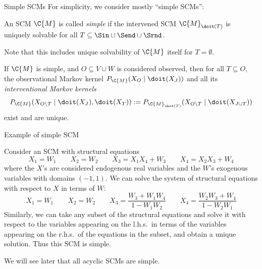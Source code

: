 \begin{frame}{Simple SCMs}
For simplicity, we consider mostly ``simple SCMs'':
\begin{definition}
  An SCM $\C{M}$ is called \emph{simple} if the intervened SCM
  $\C{M}_{\doit(T)}$ is uniquely solvable for all $T \subseteq \Sin \cup \Send \cup \Srnd$. 
\end{definition}
Note that this includes unique solvability of $\C{M}$ itself for $T = \emptyset$.
\begin{corollary}
  If $\C{M}$ is simple, and $O \subseteq V \cup W$ is considered observed, then for all $T \subseteq O$, the
  observational Markov kernel $P_{\C{M}}(X_O \mid \doit(X_J))$
  and all its \emph{interventional Markov kernels}
  $$P_{\C{M}}(X_{O\setminus T} \mid \doit(X_J),\doit(X_T)) := P_{\C{M}_{\doit(T)}}(X_{O\setminus T} \mid \doit(X_{J \cup T}))$$
  exist and are unique.
\end{corollary}
\end{frame}

\begin{frame}{Example of simple SCM}
\begin{example}
Consider an SCM with structural equations
$$X_1 = W_1 \qquad X_2 = W_2 \qquad X_3 = X_1 X_4 + W_3 \qquad X_4 = X_2 X_3 + W_4 $$
where the $X$'s are considered endogenous real variables and the $W$'s exogenous variables with domains $(-1,1)$.
We can solve the system of structural equations with respect to $X$ in terms of $W$:
$$X_1 = W_1 \qquad X_2 = W_2 \qquad X_3 = \frac{W_3 + W_1 W_4}{1 - W_1 W_2} \qquad X_4 = \frac{W_2 W_3 + W_4}{1 - W_2 W_1}$$
Similarly, we can take any subset of the structural equations and solve it with respect to the variables appearing on the l.h.s.\ in terms of the variables appearing on the r.h.s.\ of the equations in the subset, and obtain a unique solution. Thus this SCM is simple.
\end{example}
We will see later that all acyclic SCMs are simple.
\end{frame}

